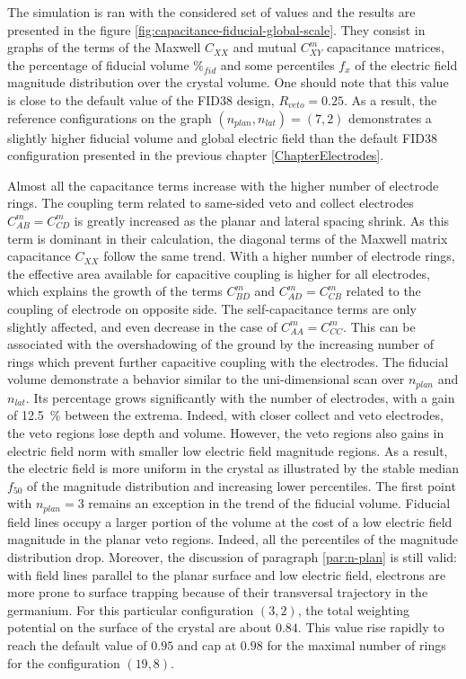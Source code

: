 The simulation is ran with the considered set of values and the results are presented in the figure \ref{fig:capacitance-fiducial-global-scale}.  They consist in graphs of the terms of the Maxwell $C_{XX}$ and mutual $C_{XY}^m$ capacitance matrices, the percentage of fiducial volume $\%_{fid}$ and some percentiles $f_x$ of the electric field magnitude distribution over the crystal volume.
One should note that this value is close to the default value of the FID38 design, $R_{veto}=0.25$. As a result, the reference configurations on the graph $\left( n_{plan}, n_{lat} \right) = (7,2)$ demonstrates a slightly higher fiducial volume and global electric field than the default FID38 configuration presented in the previous chapter \ref{ChapterElectrodes}.

Almost all the capacitance terms increase with the higher number of electrode rings. The coupling term related to same-sided veto and collect electrodes $C_{AB}^m=C_{CD}^m$ is greatly increased as the planar and lateral spacing shrink. As this term is dominant in their calculation, the diagonal terms of the Maxwell matrix capacitance $C_{XX}$ follow the same trend. With a higher number of electrode rings, the effective area available for capacitive coupling is higher for all electrodes, which explains the growth of the terms $C_{BD}^m$ and $C_{AD}^m=C_{CB}^m$ related to the coupling of electrode on opposite side. The self-capacitance terms are only slightly affected, and even decrease in the case of $C_{AA}^m=C_{CC}^m$. This can be associated with the overshadowing of the ground by the increasing number of rings which prevent further capacitive coupling with the electrodes.
The fiducial volume demonstrate a behavior similar to the uni-dimensional scan over $n_{plan}$ and $n_{lat}$. Its percentage grows significantly with the number of electrodes, with a gain of \SI{12.5}{\percent} between the extrema. 
Indeed, with closer collect and veto electrodes, the veto regions lose depth and volume. However, the veto regions also gains in electric field norm with smaller low electric field magnitude regions. As a result, the electric field is more uniform in the crystal as illustrated by the stable median $f_{50}$ of the magnitude distribution and increasing lower percentiles.
The first point with $n_{plan} = 3$ remains an exception in the trend of the fiducial volume. Fiducial field lines occupy a larger portion of the volume at the cost of a low electric field magnitude in the planar veto regions. Indeed, all the percentiles of the magnitude distribution drop. Moreover, the discussion of paragraph \ref{par:n-plan} is still valid: with field lines parallel to the planar surface and low electric field, electrons are more prone to surface trapping because of their transversal trajectory in the germanium.
For this particular configuration $(3,2)$, the total weighting potential on the surface of the crystal are about $0.84$. This value rise rapidly to reach the default value of $0.95$ and cap at $0.98$ for the maximal number of rings for the configuration $(19,8)$.

